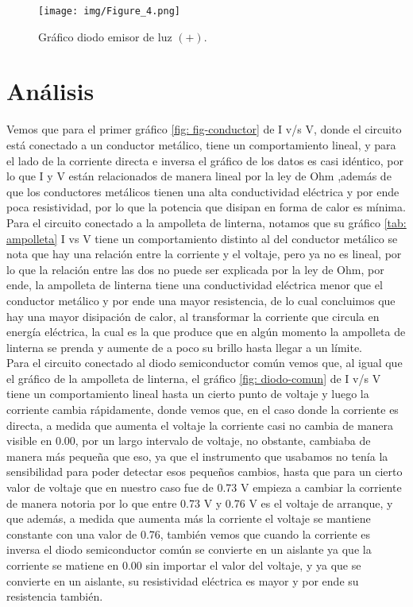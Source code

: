 \documentclass[]{article}
\begin{document}
\begin{figure}
  \centering
  \texttt{[image: img/Figure\_4.png]}
  \caption{\label{fig: emisor-luz}Gráfico diodo emisor de luz $(+)$.} 
\end{figure}








\section{Análisis}
Vemos que para el primer gráfico \ref{fig: fig-conductor} de I v/s V, donde el circuito está conectado a un conductor metálico, tiene un comportamiento lineal, y para el lado de la corriente directa e inversa el gráfico de los datos es casi idéntico, por lo que I y V están relacionados de manera lineal por la ley de Ohm %
,además de que los conductores metálicos tienen una alta conductividad eléctrica y por ende poca resistividad, por lo que la potencia que disipan en forma de calor es mínima.\\

Para el circuito conectado a la ampolleta de linterna, notamos que su gráfico \ref{tab: ampolleta} I vs V tiene un comportamiento distinto al del conductor metálico se nota que hay una relación entre la corriente y el voltaje, pero ya no es lineal, por lo que la relación entre las dos no puede ser explicada por la ley de Ohm, por ende, la ampolleta de linterna tiene una conductividad eléctrica menor que el conductor metálico y por ende una mayor resistencia, de lo cual concluimos que hay una mayor disipación de calor, al transformar la corriente que circula en energía eléctrica, la cual es la que produce que en algún momento la ampolleta de linterna se prenda y aumente de a poco su brillo hasta llegar a un límite.\\

Para el circuito conectado al diodo semiconductor común vemos que, al igual que el gráfico de la ampolleta de linterna, el gráfico  \ref{fig: diodo-comun} de I v/s V tiene un comportamiento lineal hasta un cierto punto de voltaje y luego la corriente cambia rápidamente, donde vemos que, en el caso donde la corriente es directa, a medida que aumenta el voltaje la corriente casi no cambia de manera visible en 0.00, por un largo intervalo de voltaje, no obstante, cambiaba de manera más pequeña que eso, ya que el instrumento que usabamos no tenía la sensibilidad para poder detectar esos pequeños cambios, hasta que para un cierto valor de voltaje que en nuestro caso fue de 0.73 V empieza a cambiar la corriente de manera notoria por lo que entre 0.73 V y 0.76 V es el voltaje de arranque, y que además, a medida que aumenta más la corriente el voltaje se mantiene constante con una valor de 0.76, también vemos que cuando la corriente es inversa el diodo semiconductor común se convierte en un aislante ya que la corriente se matiene en 0.00 sin importar el valor del voltaje, y ya que se convierte en un aislante, su resistividad eléctrica es mayor y por ende su resistencia también.\\
\end{document}
